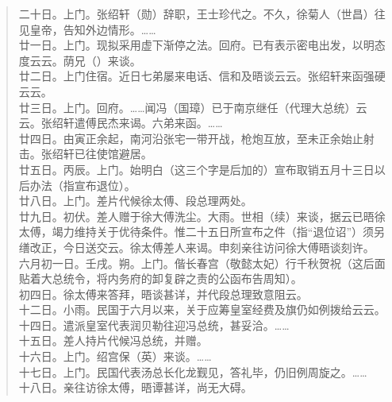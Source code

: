 \begin{quote}
	二十日。上门。张绍轩（勋）辞职，王士珍代之。不久，徐菊人（世昌）往见皇帝，告知外边情形。……\\

廿一日。上门。现拟采用虚下渐停之法。回府。已有表示密电出发，以明态度云云。荫兄（）来谈。\\

廿二日。上门住宿。近日七弟屡来电话、信和及晤谈云云。张绍轩来函强硬云云。\\

廿三日。上门。回府。……闻冯（国璋）已于南京继任（代理大总统）云云。张绍轩遣傅民杰来谒。六弟来函。……\\

廿四日。由寅正余起，南河沿张宅一带开战，枪炮互放，至未正余始止射击。张绍轩已往使馆避居。\\

廿五日。丙辰。上门。始明白（这三个字是后加的）宣布取销五月十三日以后办法（指宣布退位）。\\

廿八日。上门。差片代候徐太傅、段总理两处。\\

廿九日。初伏。差人赠于徐大傅洗尘。大雨。世相（续）来谈，据云已晤徐太傅，竭力维持关于优待条件。惟二十五日所宣布之件（指“退位诏”）须另缮改正，今日送交云。徐太傅差人来谒。申刻亲往访问徐大傅晤谈刻许。\\

六月初一日。壬戌。朔。上门。偕长春宫（敬懿太妃）行千秋贺祝（这后面贴着大总统令，将内务府的卸复辟之责的公函布告周知）。\\

初四日。徐太傅来答拜，晤谈甚详，并代段总理致意阻云。\\

十二日。小雨。民国于六月以来，关于应筹皇室经费及旗仍如例拨给云云。\\

十四日。遣派皇室代表润贝勒往迎冯总统，甚妥洽。……\\

十五日。差人持片代候冯总统，并赠。\\

十六日。上门。绍宫保（英）来谈。……\\

十七日。上门。民国代表汤总长化龙觐见，答礼毕，仍旧例周旋之。……\\

十八日。亲往访徐太傅，晤谭甚详，尚无大碍。\\


\end{quote}

